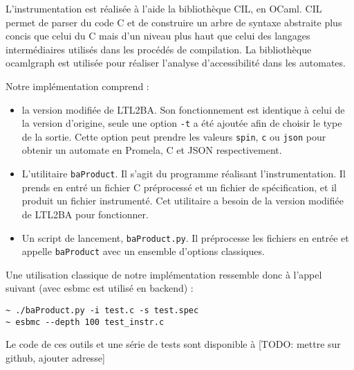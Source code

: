 L'instrumentation est réalisée à l'aide la bibliothèque
CIL\cite{cil}, en OCaml\cite{ocamlrefman}. CIL permet de parser
du code C et de construire un arbre de syntaxe abstraite plus concis que
celui du C mais d'un niveau plus haut que celui des langages
intermédiaires utilisés dans les procédés de compilation. La
bibliothèque ocamlgraph\cite{ocamlgraph} est utilisée pour réaliser
l'analyse d'accessibilité dans les automates.

Notre implémentation comprend :

\begin{itemize}
\item
  la version modifiée de LTL2BA. Son fonctionnement est identique à
  celui de la version d'origine, seule une option \texttt{-t} a été
  ajoutée afin de choisir le type de la sortie. Cette option peut
  prendre les valeurs \texttt{spin}, \texttt{c} ou
  \texttt{json} pour obtenir un automate en Promela, C et JSON
  respectivement.
\item
  L'utilitaire \texttt{baProduct}. Il s'agit du programme réalisant
  l'instrumentation. Il prends en entré un fichier C préprocessé et un
  fichier de spécification, et il produit un fichier instrumenté. Cet
  utilitaire a besoin de la version modifiée de LTL2BA pour fonctionner.
\item
  Un script de lancement, \texttt{baProduct.py}. Il préprocesse les
  fichiers en entrée et appelle \texttt{baProduct} avec un ensemble
  d'options classiques.
\end{itemize}

Une utilisation classique de notre implémentation ressemble donc à
l'appel suivant (avec esbmc\cite{ESBMC} est utilisé en backend) :

\begin{lstlisting}
~ ./baProduct.py -i test.c -s test.spec
~ esbmc --depth 100 test_instr.c
\end{lstlisting}

Le code de ces outils et une série de tests sont disponible à {[}TODO:
mettre sur github, ajouter adresse{]}
